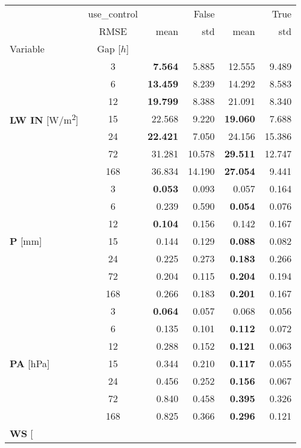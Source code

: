\begin{tabular}{p{2.1cm}c|rr|rr}
\toprule
 & use_control & \multicolumn{2}{r}{False} & \multicolumn{2}{r}{True} \\
 & RMSE & mean & std & mean & std \\
Variable & Gap [$h$] &  &  &  &  \\
\midrule
\multirow[c]{7}{*}{\parbox{2.1cm}{\textbf{LW IN} [\si{W/m^2}]}} & 3 & \bfseries 7.564 & 5.885 & 12.555 & 9.489 \\
 & 6 & \bfseries 13.459 & 8.239 & 14.292 & 8.583 \\
 & 12 & \bfseries 19.799 & 8.388 & 21.091 & 8.340 \\
 & 15 & 22.568 & 9.220 & \bfseries 19.060 & 7.688 \\
 & 24 & \bfseries 22.421 & 7.050 & 24.156 & 15.386 \\
 & 72 & 31.281 & 10.578 & \bfseries 29.511 & 12.747 \\
 & 168 & 36.834 & 14.190 & \bfseries 27.054 & 9.441 \\
\cline{1-6}
\multirow[c]{7}{*}{\parbox{2.1cm}{\textbf{P} [\si{mm}]}} & 3 & \bfseries 0.053 & 0.093 & 0.057 & 0.164 \\
 & 6 & 0.239 & 0.590 & \bfseries 0.054 & 0.076 \\
 & 12 & \bfseries 0.104 & 0.156 & 0.142 & 0.167 \\
 & 15 & 0.144 & 0.129 & \bfseries 0.088 & 0.082 \\
 & 24 & 0.225 & 0.273 & \bfseries 0.183 & 0.266 \\
 & 72 & 0.204 & 0.115 & \bfseries 0.204 & 0.194 \\
 & 168 & 0.266 & 0.183 & \bfseries 0.201 & 0.167 \\
\cline{1-6}
\multirow[c]{7}{*}{\parbox{2.1cm}{\textbf{PA} [\si{hPa}]}} & 3 & \bfseries 0.064 & 0.057 & 0.068 & 0.056 \\
 & 6 & 0.135 & 0.101 & \bfseries 0.112 & 0.072 \\
 & 12 & 0.288 & 0.152 & \bfseries 0.121 & 0.063 \\
 & 15 & 0.344 & 0.210 & \bfseries 0.117 & 0.055 \\
 & 24 & 0.456 & 0.252 & \bfseries 0.156 & 0.067 \\
 & 72 & 0.840 & 0.458 & \bfseries 0.395 & 0.326 \\
 & 168 & 0.825 & 0.366 & \bfseries 0.296 & 0.121 \\
\cline{1-6}
\multirow[c]{7}{*}{\parbox{2.1cm}{\textbf{WS} [\si{%
}}}
\end{tabular}
